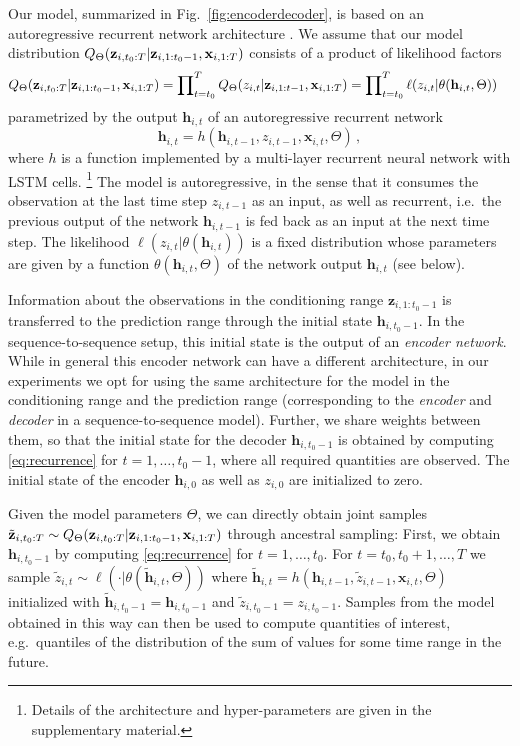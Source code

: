 \documentclass{article}
\newcommand{\z}[2]{z_{#1, #2}}
\newcommand{\xbf}{\mathbf{x}}
\newcommand{\zVec}[3]{\mathbf{z}_{#1, #2:#3}}
\newcommand{\xVec}[3]{\mathbf{x}_{#1, #2:#3}}
\newcommand{\hVec}{\mathbf{h}}
\begin{document}
Our model, summarized in Fig.~\ref{fig:encoderdecoder}, is based on an autoregressive recurrent network
architecture \cite{graves2013,sutskever2014}.
We assume that our model distribution $\modelDist$
consists of a product of likelihood factors
\begin{align*}
\modelDist &= \prod\nolimits_{t=t_0}^T Q_\Theta(z_{i,t}|\mathbf{z}_{i,1:t-1}, \xVec{i}{1}{T}) = \prod\nolimits_{t=t_0}^T \ell(\z{i}{t} | \theta(\hVec_{i, t}, \Theta))
\end{align*}
parametrized by the output $\hVec_{i, t}$ of an autoregressive recurrent network
\begin{equation}
\hVec_{i, t} = h\left(\hVec_{i, t-1}, \z{i}{t-1}, \xbf_{i, t}, \Theta\right) \,,
\label{eq:recurrence}
\end{equation}
where $h$ is a function implemented by a multi-layer recurrent neural network with LSTM cells.%
\footnote{Details of the architecture and hyper-parameters are given in the supplementary material.}
The model is autoregressive, in the sense that it consumes the observation at the last time step $\z{i}{t-1}$ as an input,
as well as recurrent, i.e.\ the previous output of the network $\hVec_{i,t-1}$ is fed back as an input at the next time step.
The likelihood $\ell(\z{i}{t}|\theta(\hVec_{i,t}))$ is a fixed distribution
whose parameters are given by a function $\theta(\hVec_{i,t}, \Theta)$ of the network output $\hVec_{i, t}$ (see below).

Information about the observations in the conditioning range $\zVec{i}{1}{t_0 -1}$ is transferred to the
prediction range through the initial state $\hVec_{i, t_0-1}$. In the sequence-to-sequence setup, this initial state is
the output of an \emph{encoder network}. While in general this encoder network can have a different architecture, in our 
experiments we opt for using the
same architecture for the model in the conditioning range and the prediction range (corresponding to the \emph{encoder} and \emph{decoder} in
a sequence-to-sequence model). Further, we share weights between them, so that the initial state
for the decoder $\hVec_{i, t_0 - 1}$ is
obtained by computing \eqref{eq:recurrence} for $t = 1, \ldots, t_0 - 1$, where all required quantities are observed.
The initial state of the encoder $\hVec_{i, 0}$ as well as $\z{i}{0}$ are initialized to zero.

Given the model parameters $\Theta$, we can directly obtain joint samples
$\tilde{\mathbf{z}}_{i, t_0:T} \sim \modelDist$ through ancestral sampling:
First, we obtain $\hVec_{i, t_0-1}$ by computing \eqref{eq:recurrence} for $t=1,\ldots, t_0$.
For $t=t_0, t_0+1, \ldots, T$ we sample $\tilde{z}_{i, t} \sim \ell(\cdot | \theta(\tilde{\mathbf{h}}_{i,t}, \Theta))$
where $\tilde{\mathbf{h}}_{i, t} = h\left(\hVec_{i, t-1}, \tilde{z}_{i, t-1}, \xbf_{i, t}, \Theta\right)$
initialized with $\tilde{\mathbf{h}}_{i, t_0-1} = \hVec_{i, t_0-1}$ and $\tilde{z}_{i, t_0 -1} = \z{i}{t_0 - 1}$.
Samples from the model obtained in this way can then be used to compute quantities
of interest, e.g.\ quantiles of the distribution of the sum of values for some
time range in the future.
\end{document}
